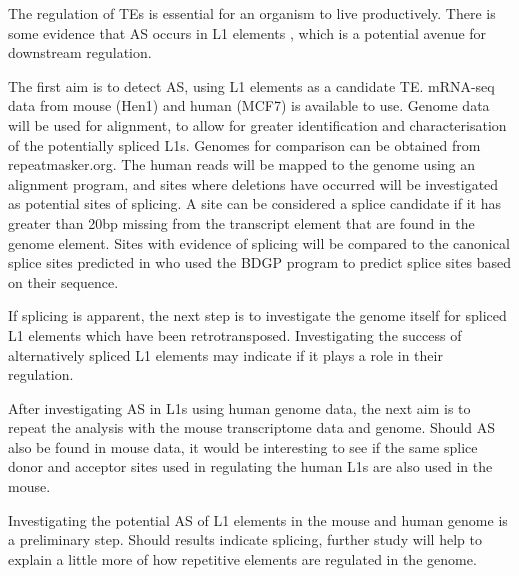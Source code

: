 \documentclass[12pt]{article}
\begin{document}
		The regulation of TEs is essential for an organism to live productively. There is some evidence that AS occurs in L1 elements \citep{Belancio06}, which is a potential avenue for downstream regulation. 
		
		The first aim is to detect AS, using L1 elements as a candidate TE. mRNA-seq data from mouse (Hen1) and human (MCF7) is available to use. Genome data will be used for alignment, to allow for greater identification and characterisation of the potentially spliced L1s. Genomes for comparison can be obtained from repeatmasker.org. The human reads will be mapped to the genome using an alignment program, and sites where deletions have occurred will be investigated as potential sites of splicing. A site can be considered a splice candidate if it has greater than 20bp missing from the transcript element that are found in the genome element. Sites with evidence of splicing will be compared to the canonical splice sites predicted in \citep{Belancio06} who used the BDGP program to predict splice sites based on their sequence. 
		
		If splicing is apparent, the next step is to investigate the genome itself for spliced L1 elements which have been retrotransposed. Investigating the success of alternatively spliced L1 elements may indicate if it plays a role in their regulation. 
		
		After investigating AS in L1s using human genome data, the next aim is to repeat the analysis with the mouse transcriptome data and genome. Should AS also be found in mouse data, it would be interesting to see if the same splice donor and acceptor sites used in regulating the human L1s are also used in the mouse. 
		
		Investigating the potential AS of L1 elements in the mouse and human genome is a preliminary step. Should results indicate splicing, further study will help to explain a little more of how repetitive elements are regulated in the genome. 
		
%		 



		
\end{document}
